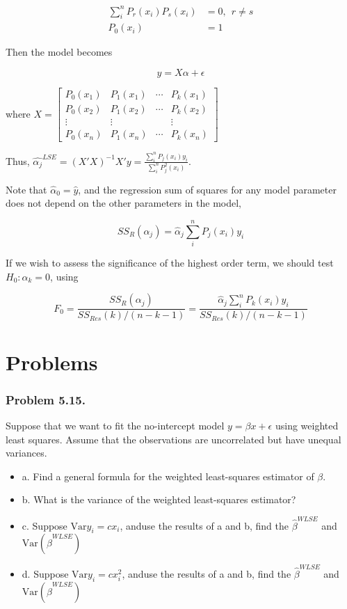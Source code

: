 \documentclass[12pt]{article}
\begin{document}
$$
\begin{aligned}
\sum_i^n P_r(x_i) P_s(x_i) &= 0, \ \ r \neq s \\[8pt]
P_0(x_i) &= 1
\end{aligned}
$$

Then the model becomes 

$$
y = X\alpha + \epsilon
$$

where $X = \begin{bmatrix} P_0(x_1) & P_1(x_1) & \cdots & P_k(x_1) \\
						   P_0(x_2) & P_1(x_2) & \cdots & P_k(x_2) \\
						   \vdots & \vdots & & \vdots \\
						   P_0(x_n) & P_1(x_n) & \cdots & P_k(x_n) \end{bmatrix}$


Thus, $\hat{\alpha_j}^{LSE} = (X'X)^{-1}X'y = \frac{\sum_i^n P_j(x_i)y_i}{\sum_i^n P_j^2(x_i)}$. 

Note that $\hat{\alpha}_0 = \hat{y}$, and the regression sum of squares for any model parameter does not depend on the other parameters in the model,

$$
SS_R(\alpha_j) = \hat{\alpha}_j \sum_i^n P_j(x_i)y_i
$$

If we wish to assess the significance of the highest order term, we should test $H_0 : \alpha_k = 0$, using

$$
F_0 = \frac{SS_R(\alpha_j)}{SS_{Res}(k)/(n-k-1)} = \frac{\hat{\alpha}_j \sum_i^n P_k (x_i) y_i}{SS_{Res}(k)/(n-k-1)}
$$


\pagebreak

\section*{Problems}

\subsubsection*{Problem 5.15.}

Suppose that we want to fit the no-intercept model $y=\beta x + \epsilon$ using weighted least squares. Assume that the observations are uncorrelated but have unequal variances. 

\begin{itemize}
	\item a. Find a general formula for the weighted least-squares estimator of $\beta$. 
	\item b. What is the variance of the weighted least-squares estimator?
	\item c. Suppose $\mathrm{Var} y_i = cx_i$, anduse the results of a and b, find the $\hat{\beta}^{WLSE}$ and $\mathrm{Var}(\hat{\beta}^{WLSE})$ 
	\item d. Suppose $\mathrm{Var} y_i = cx_i^2$, anduse the results of a and b, find the $\hat{\beta}^{WLSE}$ and $\mathrm{Var}(\hat{\beta}^{WLSE})$ 
\end{itemize}
\end{document}
